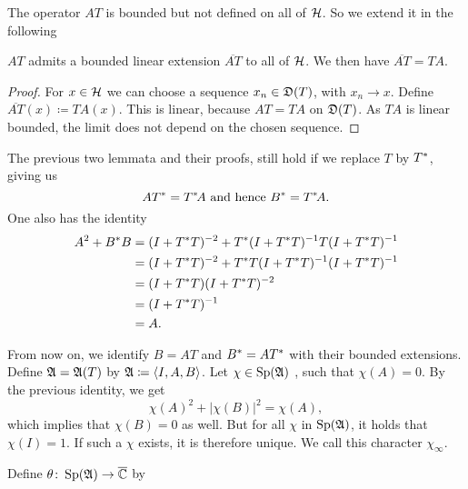 The operator $AT$ is bounded but not defined on all of $\mathcal{H}$. So we extend it
in the following

\begin{lem}
 $AT$ admits a bounded linear extension $\overline{AT}$ to all of $\mathcal{H}$. 
 We then have $\overline{AT}=TA$.
\end{lem}

\begin{proof}
 For $x \in \mathcal{H}$ we can choose a sequence $x_n \in \mathfrak{D}(T)$, with 
 $x_n \rightarrow x$. Define $\overline{AT}(x) \coloneqq TA(x)$.
 This is linear, because $AT = TA$ on $\mathfrak{D}(T)$. As $TA$ is linear bounded,
 the limit does not depend on the chosen sequence.
\end{proof}

\begin{rem}
 The previous two lemmata and their proofs, still hold if we replace $T$ by $T^{*}$,
 giving us 
 \[
  AT^{*} = T^{*} \! A \text{ and hence } B^{*} = T^{*} \! A.
 \]
 One also has the identity
 \begin{align*}
  A^2 + B^{*} B &= (I + T^{*} T)^{-2} + T ^{*} (I + T^{*} T)
		    ^{-1} T (I + T^{*} T) ^{-1} \\
		&= (I + T^{*} T)^{-2} + T ^{*} T(I + T^{*} T)
		   ^{-1} (I + T^{*} T) ^{-1} \\
		&= (I + T^{*} T)(I + T^{*} T)^{-2} \\
		&= (I + T^{*} T)^{-1}  \\
		&= A .
  \end{align*}

  

\end{rem}

From now on, we identify $B={AT}$ and $B^{*} ={AT^{*}}$
with their bounded extensions.
Define $\mathfrak{A} = \mathfrak{A}(T)$ by $\mathfrak{A} \coloneqq  \left\langle I, A, B  \right\rangle$. Let $ \chi \in \operatorname{Sp} (\mathfrak{A})$
, such that $\chi(A) =0$. By the previous identity, we get
\[
 \chi(A)^2 + |\chi(B)|^2 = \chi(A),
\]
which implies that $\chi(B) =0$ as well. But for all $\chi$ in  $\operatorname{Sp} (\mathfrak{A})$, 
 it holds that $\chi(I)=1$.
If such a $\chi$ exists, it is therefore unique. We call this
character $\chi_\infty$.

Define $\theta \colon \operatorname{Sp} (\mathfrak{A}) \to {\overline{\mathbb{C}}}$ by

